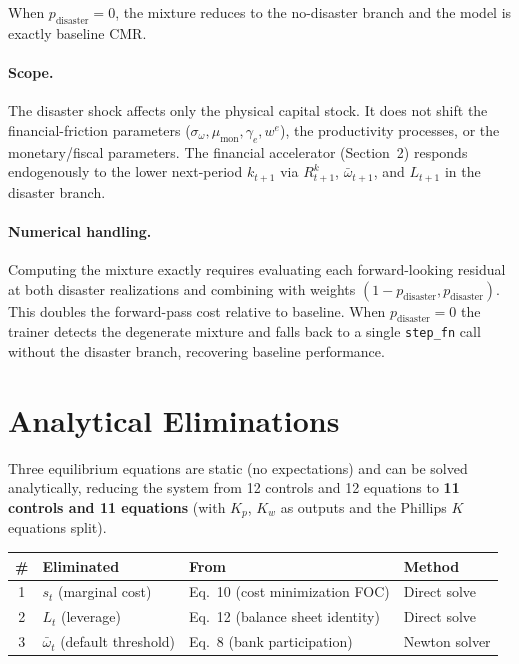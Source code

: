 \documentclass[11pt]{article}
\begin{document}
When $p_{\text{disaster}} = 0$, the mixture reduces to the no-disaster
branch and the model is exactly baseline CMR.

\paragraph{Scope.}
The disaster shock affects only the physical capital stock. It does not
shift the financial-friction parameters ($\sigma_\omega, \mu_{\text{mon}},
\gamma_e, w^e$), the productivity processes, or the monetary/fiscal
parameters. The financial accelerator (Section~2) responds endogenously
to the lower next-period $k_{t+1}$ via $R^k_{t+1}$, $\bar\omega_{t+1}$,
and $L_{t+1}$ in the disaster branch.

\paragraph{Numerical handling.}
Computing the mixture exactly requires evaluating each forward-looking
residual at both disaster realizations and combining with weights
$(1 - p_{\text{disaster}}, p_{\text{disaster}})$. This doubles the
forward-pass cost relative to baseline. When $p_{\text{disaster}} = 0$
the trainer detects the degenerate mixture and falls back to a single
\texttt{step\_fn} call without the disaster branch, recovering baseline
performance.


\section{Analytical Eliminations}
\label{sec:eliminations}

Three equilibrium equations are static (no expectations) and can be solved
analytically, reducing the system from 12 controls and 12 equations to
\textbf{11 controls and 11 equations} (with $K_p$, $K_w$ as outputs and
the Phillips $K$ equations split).

\begin{center}
\begin{tabular}{clll}
\toprule
\# & Eliminated & From & Method \\
\midrule
1 & $s_t$ (marginal cost) & Eq.~10 (cost minimization FOC) & Direct solve \\
2 & $L_t$ (leverage) & Eq.~12 (balance sheet identity) & Direct solve \\
3 & $\bar\omega_t$ (default threshold) & Eq.~8 (bank participation) & Newton solver \\
\bottomrule
\end{tabular}
\end{center}
\end{document}
